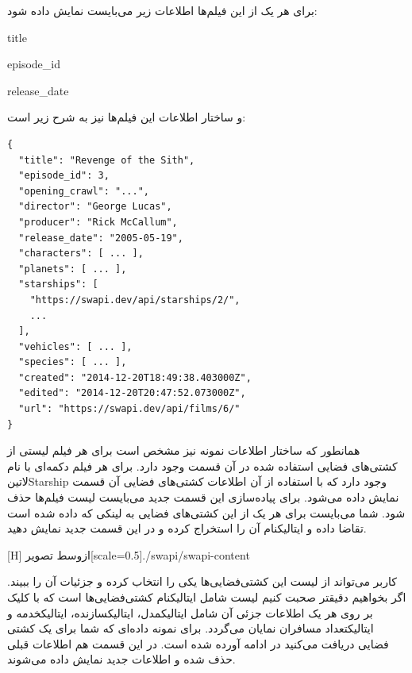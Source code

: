 برای هر یک از این فیلم‌ها اطلاعات زیر می‌بایست نمایش داده شود:

\begin{itemize}\begin{latinitems}
  \item title
  \item episode\_id
  \item release\_date
\end{latinitems}\end{itemize}

و ساختار اطلاعات این فیلم‌ها نیز به شرح زیر است:

\begin{latin}
\begin{verbatim}
{
  "title": "Revenge of the Sith",
  "episode_id": 3,
  "opening_crawl": "...",
  "director": "George Lucas",
  "producer": "Rick McCallum",
  "release_date": "2005-05-19",
  "characters": [ ... ],
  "planets": [ ... ],
  "starships": [
    "https://swapi.dev/api/starships/2/",
    ...
  ],
  "vehicles": [ ... ],
  "species": [ ... ],
  "created": "2014-12-20T18:49:38.403000Z",
  "edited": "2014-12-20T20:47:52.073000Z",
  "url": "https://swapi.dev/api/films/6/"
}
\end{verbatim}
\end{latin}

همانطور که ساختار اطلاعات نمونه نیز مشخص است برای هر فیلم لیستی از کشتی‌های فضایی استفاده شده در آن قسمت وجود دارد.
برای هر فیلم دکمه‌ای با نام ‌لاتین{Starship} وجود دارد که با استفاده از آن اطلاعات کشتی‌های فضایی آن قسمت نمایش داده می‌شود.
برای پیاده‌سازی این قسمت جدید می‌بایست لیست فیلم‌ها حذف شود.
شما می‌بایست برای هر یک از این کشتی‌های فضایی به لینکی که داده شده است تقاضا داده و ‌ایتالیک{نام} آن را استخراج کرده
و در این قسمت جدید نمایش دهید.

[H]
  ‌ازوسط
  ‌تصویر[scale=0.5]{./swapi/swapi-content}
  \caption{طراحی مستطیل محتوا}

کاربر می‌تواند از لیست این کشتی‌فضایی‌ها یکی را انتخاب کرده و جزئیات آن را ببیند.
اگر بخواهیم دقیقتر صحبت کنیم لیست شامل ‌ایتالیک{نام} کشتی‌فضایی‌ها است
که با کلیک بر روی هر یک اطلاعات جزئی آن شامل ‌ایتالیک{مدل}، ‌ایتالیک{سازنده}، ‌ایتالیک{خدمه} و ‌ایتالیک{تعداد مسافران} نمایان می‌گردد.
برای نمونه داده‌ای که شما برای یک کشتی فضایی دریافت می‌کنید در ادامه آورده شده است.
در این قسمت هم اطلاعات قبلی حذف شده و اطلاعات جدید نمایش داده می‌شوند.

